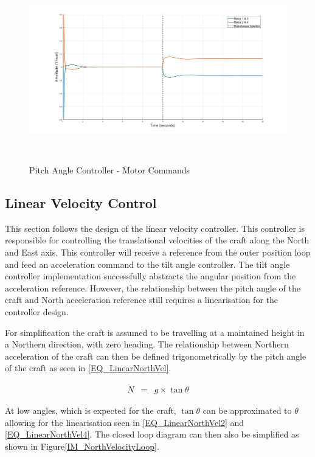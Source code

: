 \documentclass[12pt]{report}
\begin{document}
\begin{figure}[H]
	\centering
	\includegraphics[height = 8cm]{../Design/Matlab/Controllers/pitch_angle_impulse.jpg}
	\caption{Pitch Angle Controller -  Motor Commands}
	\label{IM_PitchAngleImpulse}
\end{figure}

\subsection{Linear Velocity Control}
This section follows the design of the linear velocity controller. This controller is responsible for controlling the translational velocities of the craft along the North and East axis. This controller will receive a reference from the outer position loop and feed an acceleration command to the tilt angle controller. The tilt angle controller implementation successfully abstracts the angular position from the acceleration reference. However, the relationship between the pitch angle of the craft and North acceleration reference still requires a linearisation for the controller design. 

For simplification the craft is assumed to be travelling at a maintained height in a Northern direction, with zero heading. The relationship between Northern acceleration of the craft can then be defined trigonometrically by the pitch angle of the craft as seen in \eqref{EQ_LinearNorthVel}. 

\begin{eqnarray}
\ddot{N} &=& g\times \tan \theta \label{EQ_LinearNorthVel}
\end{eqnarray}

At low angles, which is expected for the craft, $\tan \theta$ can be approximated to $\theta$ allowing for the linearisation seen in \eqref{EQ_LinearNorthVel2} and \eqref{EQ_LinearNorthVel4}. The closed loop diagram can then also be simplified as shown in Figure\ref{IM_NorthVelocityLoop}.
\end{document}
